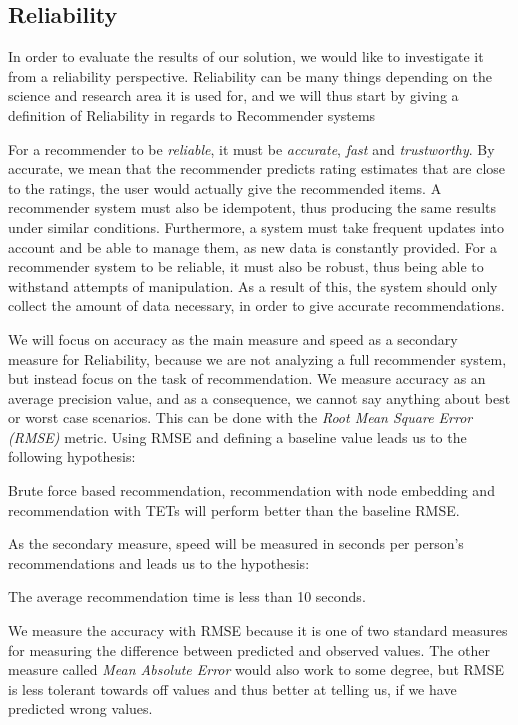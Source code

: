 \subsection{Reliability}\label{Subsec:Reliability_definition}

In order to evaluate the results of our solution, we would like to investigate it from a reliability perspective.
Reliability can be many things depending on the science and research area it is used for, and we will thus start by giving a definition of Reliability in regards to Recommender systems

For a recommender to be \textit{reliable}, it must be \textit{accurate}, \textit{fast} and \textit{trustworthy}.
By accurate, we mean that the recommender predicts rating estimates that are close to the ratings, the user would actually give the recommended items.
A recommender system must also be idempotent, thus producing the same results under similar conditions. Furthermore, a system must take frequent updates into account and be able to manage them, as new data is constantly provided.
For a recommender system to be reliable, it must also be robust, thus being able to withstand attempts of manipulation. As a result of this, the system should only collect the amount of data necessary, in order to give accurate recommendations.

We will focus on accuracy as the main measure and speed as a secondary measure for Reliability, because we are not analyzing a full recommender system, but instead focus on the task of recommendation.
We measure accuracy as an average precision value, and as a consequence, we cannot say anything about best or worst case scenarios. This can be done with the \textit{Root Mean Square Error (RMSE)} metric. Using RMSE and defining a baseline value leads us to the following hypothesis:

\begin{hypothesis}\label{RMSE_hypothesis}
  Brute force based recommendation, recommendation with node embedding and recommendation with TETs will perform better than the baseline RMSE.
\end{hypothesis}

As the secondary measure, speed will be measured in seconds per person's recommendations and leads us to the hypothesis:
\begin{hypothesis}\label{Speed_hypothesis}
  The average recommendation time is less than 10 seconds.
\end{hypothesis}

We measure the accuracy with RMSE because it is one of two standard measures for measuring the difference between predicted and observed values. The other measure called \textit{Mean Absolute Error} would also work to some degree, but RMSE is less tolerant towards off values and thus better at telling us, if we have predicted wrong values.
